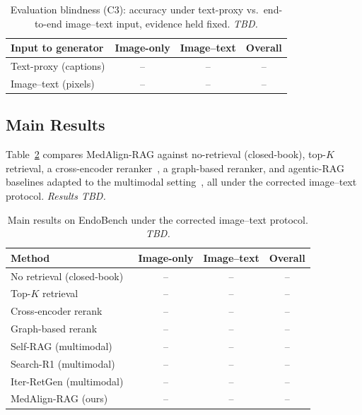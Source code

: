\begin{table}[t]
  \centering
  \begin{tabular}{lccc}
    \toprule
    Input to generator & Image-only & Image--text & Overall \\
    \midrule
    Text-proxy (captions) & -- & -- & -- \\
    Image--text (pixels)  & -- & -- & -- \\
    \bottomrule
  \end{tabular}
  \caption{Evaluation blindness (C3): accuracy under text-proxy vs.\ end-to-end
  image--text input, evidence held fixed. \emph{TBD.}}
  \label{tab:blindspot}
\end{table}

\subsection{Main Results}
\label{sec:main}
Table~\ref{tab:main} compares MedAlign-RAG against no-retrieval (closed-book),
top-$K$ retrieval, a cross-encoder reranker~\cite{nogueira2019passage}, a
graph-based reranker, and agentic-RAG baselines adapted to the multimodal
setting~\cite{asai2024selfrag,jin2025searchr1,shao2023iterretgen}, all under the
corrected image--text protocol. \emph{Results TBD.}

\begin{table}[t]
  \centering
  \begin{tabular}{lccc}
    \toprule
    Method & Image-only & Image--text & Overall \\
    \midrule
    No retrieval (closed-book)       & -- & -- & -- \\
    Top-$K$ retrieval                & -- & -- & -- \\
    Cross-encoder rerank~\cite{nogueira2019passage} & -- & -- & -- \\
    Graph-based rerank               & -- & -- & -- \\
    Self-RAG (multimodal)~\cite{asai2024selfrag}    & -- & -- & -- \\
    Search-R1 (multimodal)~\cite{jin2025searchr1}   & -- & -- & -- \\
    Iter-RetGen (multimodal)~\cite{shao2023iterretgen} & -- & -- & -- \\
    \midrule
    MedAlign-RAG (ours)              & -- & -- & -- \\
    \bottomrule
  \end{tabular}
  \caption{Main results on EndoBench under the corrected image--text protocol.
  \emph{TBD.}}
  \label{tab:main}
\end{table}

